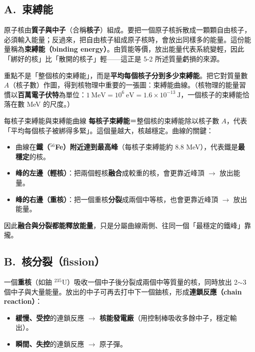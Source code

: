 \documentclass[11pt]{article}
\begin{document}
\subsection*{\sffamily A.\ 束縛能}

原子核由\textbf{質子與中子}（合稱\textbf{核子}）組成。要把一個原子核拆散成一顆顆自由核子，必須輸入能量；反過來，把自由核子組成原子核時，會放出同樣多的能量。這份能量稱為\textbf{束縛能（binding energy）}。由質能等價，放出能量代表系統變輕，因此「綁好的核」比「散開的核子」輕——這正是 5-2 所述質量虧損的來源。

重點不是「整個核的束縛能」，而是\textbf{平均每個核子分到多少束縛能}。把它對質量數 $A$（核子數）作圖，得到核物理中重要的一張圖：束縛能曲線。（核物理的能量習慣以\textbf{百萬電子伏特}為單位：$1\ \text{MeV}=10^6\ \text{eV}=1.6\times10^{-13}\ \text{J}$，一個核子的束縛能恰落在數 MeV 的尺度。）

\begin{補充框}{每核子束縛能與束縛能曲線}
\textbf{每核子束縛能}＝整個核的束縛能除以核子數 $A$，代表「平均每個核子被綁得多緊」。這個量越大，核越穩定。曲線的關鍵：
\begin{itemize}\setlength{\itemsep}{1pt}
\item 曲線在\textbf{鐵（$^{56}$Fe）附近達到最高峰}（每核子束縛能約 8.8 MeV），代表鐵是\textbf{最穩定}的核。
\item \textbf{峰的左邊（輕核）}：把兩個輕核\textbf{融合}成較重的核，會更靠近峰頂 $\rightarrow$ 放出能量。
\item \textbf{峰的右邊（重核）}：把一個重核\textbf{分裂}成兩個中等核，也會更靠近峰頂 $\rightarrow$ 放出能量。
\end{itemize}
因此\textbf{融合與分裂都能釋放能量}，只是分屬曲線兩側、往同一個「最穩定的鐵峰」靠攏。
\end{補充框}


\subsection*{\sffamily B.\ 核分裂（fission）}

一個\textbf{重核}（如鈾 $^{235}$U）吸收一個中子後分裂成兩個中等質量的核，同時放出 2$\sim$3 個中子與大量能量。放出的中子可再去打中下一個鈾核，形成\textbf{連鎖反應（chain reaction）}：

\begin{itemize}\setlength{\itemsep}{1pt}
\item \textbf{緩慢、受控}的連鎖反應 $\rightarrow$ \textbf{核能發電廠}（用控制棒吸收多餘中子，穩定輸出）。
\item \textbf{瞬間、失控}的連鎖反應 $\rightarrow$ 原子彈。
\end{itemize}
\end{document}
